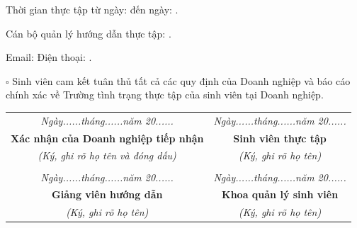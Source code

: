 \documentclass[12pt]{article}
\newcommand{\densedotfill}{\leavevmode\cleaders\hbox{.\hspace{1.5pt}}\hfill\kern0pt}
\begin{document}
\noindent Thời gian thực tập từ ngày: \makebox[3cm]{\densedotfill} đến ngày: \densedotfill

\noindent Cán bộ quản lý hướng dẫn thực tập: \densedotfill

\noindent Email: \makebox[4cm]{\densedotfill} Điện thoại: \densedotfill

\vspace{0.5cm}

\noindent $\square$ Sinh viên cam kết tuân thủ tất cả các quy định của Doanh nghiệp và báo cáo chính xác về Trường tình trạng thực tập của sinh viên tại Doanh nghiệp.

\vspace{0.5cm}

\noindent
\begin{tabularx}{\textwidth}{@{}C C@{}}
\textit{Ngày......tháng......năm 20......} & \textit{Ngày......tháng......năm 20......} \\
\textbf{Xác nhận của Doanh nghiệp tiếp nhận} & \textbf{Sinh viên thực tập} \\
\textit{(Ký, ghi rõ họ tên và đóng dấu)} & \textit{(Ký, ghi rõ họ tên)} \\
\vspace{2.5cm} & \vspace{2.5cm} \\
\textit{Ngày......tháng......năm 20......} & \textit{Ngày......tháng......năm 20......} \\
\textbf{Giảng viên hướng dẫn} & \textbf{Khoa quản lý sinh viên} \\
\textit{(Ký, ghi rõ họ tên)} & \textit{(Ký, ghi rõ họ tên)} \\
\end{tabularx}
\end{document}
